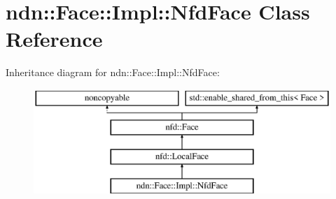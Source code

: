 \hypertarget{classndn_1_1Face_1_1Impl_1_1NfdFace}{}\section{ndn\+:\+:Face\+:\+:Impl\+:\+:Nfd\+Face Class Reference}
\label{classndn_1_1Face_1_1Impl_1_1NfdFace}
Inheritance diagram for ndn\+:\+:Face\+:\+:Impl\+:\+:Nfd\+Face\+:\begin{figure}[H]
\begin{center}
\leavevmode
\includegraphics[height=4.000000cm]{classndn_1_1Face_1_1Impl_1_1NfdFace}
\end{center}
\end{figure}
